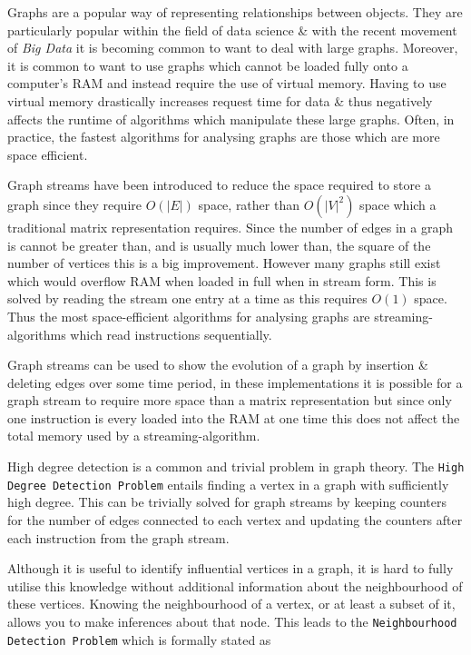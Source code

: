 \documentclass[11pt,twoside,a4paper]{report}
\begin{document}
Graphs are a popular way of representing relationships between objects. They are particularly popular within the field of data science \& with the recent movement of \textit{Big Data} it is becoming common to want to deal with large graphs. Moreover, it is common to want to use graphs which cannot be loaded fully onto a computer's RAM and instead require the use of virtual memory. Having to use virtual memory drastically increases request time for data \& thus negatively affects the runtime of algorithms which manipulate these large graphs. Often, in practice, the fastest algorithms for analysing graphs are those which are more space efficient. %
\par Graph streams have been introduced to reduce the space required to store a graph since they require $O(|E|)$ space, rather than $O(|V|^2)$ space which a traditional matrix representation requires. %
Since the number of edges in a graph is cannot be greater than, and is usually much lower than, the square of the number of vertices this is a big improvement. However many graphs still exist which would overflow RAM when loaded in full when in stream form. This is solved by reading the stream one entry at a time as this requires $O(1)$ space. Thus the most space-efficient algorithms for analysing graphs are streaming-algorithms which read instructions sequentially.
\par Graph streams can be used to show the evolution of a graph by insertion \& deleting edges over some time period, in these implementations it is possible for a graph stream to require more space than a matrix representation but since only one instruction is every loaded into the RAM at one time this does not affect the total memory used by a streaming-algorithm. %
\horizontalline
\par High degree detection is a common and trivial problem in graph theory. The \texttt{High Degree Detection Problem} entails finding a vertex in a graph with sufficiently high degree. This can be trivially solved for graph streams by keeping counters for the number of edges connected to each vertex and updating the counters after each instruction from the graph stream. %
\par Although it is useful to identify influential vertices in a graph, it is hard to fully utilise this knowledge without additional information about the neighbourhood of these vertices. Knowing the neighbourhood of a vertex, or at least a subset of it, allows you to make inferences about that node. This leads to the \texttt{Neighbourhood Detection Problem} which is formally stated as
\end{document}
